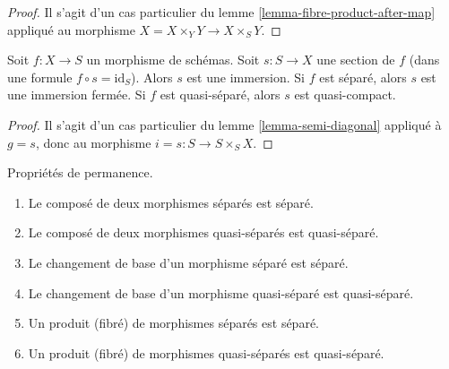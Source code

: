 \begin{proof}
Il s'agit d'un cas particulier du lemme \ref{lemma-fibre-product-after-map}
appliqué au morphisme $X = X \times_Y Y \to X \times_S Y$.
\end{proof}

\begin{lemma}
\label{lemma-section-immersion}
Soit $f : X \to S$ un morphisme de schémas.
Soit $s : S \to X$ une section de $f$ (dans une formule $f \circ s = \text{id}_S$).
Alors $s$ est une immersion.
Si $f$ est séparé, alors $s$ est une immersion fermée.
Si $f$ est quasi-séparé, alors $s$ est quasi-compact.
\end{lemma}

\begin{proof}
Il s'agit d'un cas particulier du lemme \ref{lemma-semi-diagonal} appliqué
à $g =s$, donc au morphisme $i = s : S \to S \times_S X$.
\end{proof}

\begin{lemma}
\label{lemma-separated-permanence}
Propriétés de permanence.
\begin{enumerate}
\item Le composé de deux morphismes séparés est séparé.
\item Le composé de deux morphismes quasi-séparés est quasi-séparé.
\item Le changement de base d'un morphisme séparé est séparé.
\item Le changement de base d'un morphisme quasi-séparé est quasi-séparé.
\item Un produit (fibré) de morphismes séparés est séparé.
\item Un produit (fibré) de morphismes quasi-séparés est quasi-séparé.
\end{enumerate}
\end{lemma}

